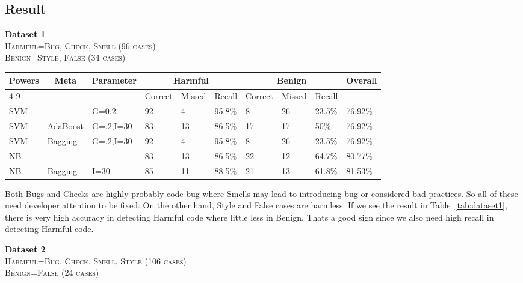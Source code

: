 \documentclass[nocopyrightspace]{sigplanconf}
\begin{document}
\subsection{Result}
\textbf{Dataset 1}\\
\textsc{Harmful=Bug, Check, Smell (96 cases)}\\
\textsc{Benign=Style, False (34 cases)}\\

\begin{table*}[htb!]
\centering
\begin{tabularx}{\textwidth}{|X|X|X|X|X|X|X|X|X|X|}
\hline
\multicolumn{1}{|c|}{\multirow{2}{*}{Powers}} & 
\multicolumn{1}{|c|}{\multirow{2}{*}{Meta}} & 
\multicolumn{1}{|c|}{\multirow{2}{*}{Parameter}} & 
\multicolumn{3}{|c|}{Harmful} & 
\multicolumn{3}{|c|}{Benign} & 
\multicolumn{1}{|c|}{\multirow{2}{*}{Overall}} \\
\cline{4-9}

& & & Correct & Missed & Recall & Correct & Missed & Recall & \\
\hline

SVM & & G=0.2 & 92 & 4 & 95.8\% & 8 & 26 & 23.5\% & 76.92\% \\
\hline
SVM & AdaBoost & G=.2,I=30 & 83 & 13 & 86.5\% & 17 & 17 & 50\% & 76.92\% \\
\hline
SVM	& Bagging& G=.2,I=30  & 92 & 4 & 95.8\% & 8 & 26 & 23.5\% & 76.92\% \\
\hline
NB & & & 83 & 13 & 86.5\% & 22 & 12 & 64.7\% & 80.77\% \\
\hline
NB & Bagging & I=30 & 85 & 11 & 88.5\% & 21 & 13 & 61.8\% & 81.53\% \\
\hline
\end{tabularx}
\caption{Effectiveness on Recalling Bug, Check and Smell}
\label{tab:dataset1}
\end{table*}


\noindent
Both Bugs and Checks are highly probably code bug where Smells may lead to introducing bug or considered bad practices. So all of these need developer attention to be fixed. On the other hand, Style and False cases are harmless. If we see the result in Table~\ref{tab:dataset1}, there is very high accuracy in detecting Harmful code where little less in Benign. Thats a good sign since we also need high recall in detecting Harmful code.

\vspace{10 pt}
\noindent
\textbf{Dataset 2}\\
\textsc{Harmful=Bug, Check, Smell, Style (106 cases)}\\
\textsc{Benign=False (24 cases)}\\
\end{document}
